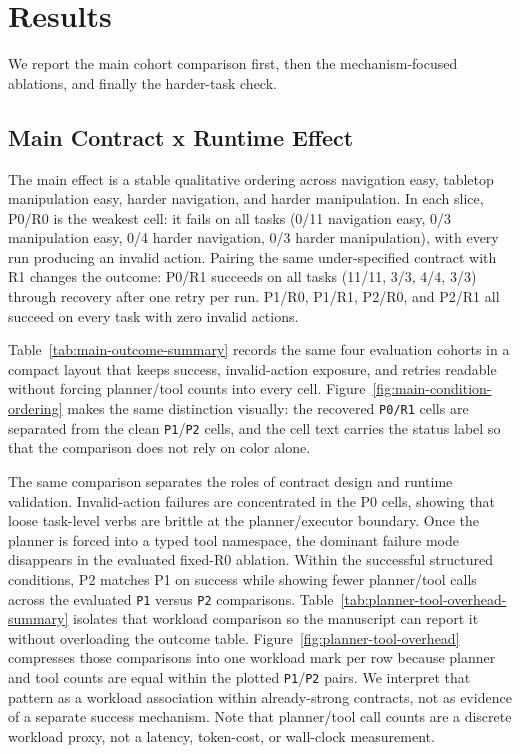 \section{Results}

We report the main cohort comparison first, then the mechanism-focused
ablations, and finally the harder-task check.

\subsection{Main Contract x Runtime Effect}

The main effect is a stable qualitative ordering across navigation easy,
tabletop manipulation easy, harder navigation, and harder manipulation. In
each slice, P0/R0 is the weakest cell: it fails on all tasks (0/11 navigation
easy, 0/3 manipulation easy, 0/4 harder navigation, 0/3 harder manipulation),
with every run producing an invalid action. Pairing the same under-specified
contract with R1 changes the outcome: P0/R1 succeeds on all tasks (11/11,
3/3, 4/4, 3/3) through recovery after one retry per run. P1/R0, P1/R1,
P2/R0, and P2/R1 all succeed on every task with zero invalid actions.




Table~\ref{tab:main-outcome-summary} records the same four evaluation cohorts
in a compact layout that keeps success, invalid-action exposure, and
retries readable without forcing planner/tool counts into every cell.
Figure~\ref{fig:main-condition-ordering} makes the same distinction visually:
the recovered \texttt{P0/R1} cells are separated from the clean
\texttt{P1}/\texttt{P2} cells, and the cell text carries the status label so
that the comparison does not rely on color alone.

The same comparison separates the roles of contract design and runtime
validation. Invalid-action failures are concentrated in the P0 cells, showing
that loose task-level verbs are brittle at the planner/executor boundary. Once
the planner is forced into a typed tool namespace, the dominant failure mode
disappears in the evaluated fixed-R0 ablation. Within the successful
structured conditions, P2 matches P1 on success while showing fewer
planner/tool calls across the evaluated \texttt{P1} versus \texttt{P2}
comparisons.
Table~\ref{tab:planner-tool-overhead-summary} isolates that workload
comparison so the manuscript can report it without overloading the outcome
table. Figure~\ref{fig:planner-tool-overhead} compresses those
comparisons into one workload mark per row because planner and tool counts are
equal within the plotted \texttt{P1}/\texttt{P2} pairs. We interpret that
pattern as a workload association within already-strong contracts, not as
evidence of a separate success mechanism. Note that planner/tool call counts
are a discrete workload proxy, not a latency, token-cost, or wall-clock
measurement.

